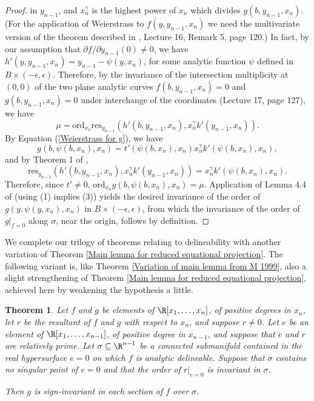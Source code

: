 \documentclass{article}
\newtheorem{theorem}{Theorem}
\begin{document}
\begin{proof}
    in $y_{n-1}$, and $x_n^\gamma$ is the highest power of $x_n$ which
    divides $g(b, y_{n-1}, x_n)$.
    (For the application of Weierstrass to $f(y, y_{n-1}, x_n)$
    we need the multivariate version of the theorem described in 
    \cite{Abhyankar1990}, Lecture 16, Remark 5, page 120.)
    In fact, by our assumption that 
    $\partial f/\partial y_{n-1}(0)\neq 0$,
    we have $h'(y, y_{n-1}, x_n) = y_{n-1} - \psi(y, x_n)$,
    for some analytic function $\psi$ defined in 
    $B \times (-\epsilon, \epsilon)$.
    Therefore, by the invariance of the intersection multiplicity
    at $(0,0)$ of the two plane analytic curves 
    $f(b, y_{n-1}, x_n) = 0$ and $g(b, y_{n-1}, x_n) = 0$
    under interchange of the coordinates 
    \cite{Abhyankar1990} (Lecture 17, page 127), we have
    \[\mu = \mathrm{ord}_{x_n} \mathrm{res}_{y_{n-1}}
            (h'(b, y_{n-1}, x_n), x_n^\gamma k'(y_{n-1}, x_n)).\]
    By Equation (\ref{Weierstrass for g}), we have
    \[g(b, \psi(b, x_n), x_n) = 
      t'(\psi(b, x_n), x_n) x_n^\gamma k'(\psi(b, x_n), x_n),\]
    and by Theorem 1 of \cite{Loos1982},
    \[ \mathrm{res}_{y_{n-1}} (h'(b, y_{n-1}, x_n), 
                               x_n^\gamma k'(y_{n-1}, x_n)) = 
                               x_n^\gamma k'(\psi(b, x_n), x_n).\]
    Therefore, since $t' \neq 0$, 
    $\mathrm{ord}_{x_n} g(b, \psi(b, x_n), x_n) = \mu$.
    Application of Lemma 4.4 of \cite{MPP2019}(using (1) implies (3))
    yields the desired invariance of the order of
    $g(y, \psi(y, x_n), x_n)$ in $B \times (-\epsilon, \epsilon)$,
    from which the invariance of the order of $g|_{f=0}$ along $\sigma$,
    near the origin, follows by definition.
\end{proof}

We complete our trilogy of theorems relating to delineability with another
variation of Theorem \ref{Main lemma for reduced equational projection}.
The following variant is, like 
Theorem \ref{Variation of main lemma from M 1999}, also a slight 
strengthening of Theorem \ref{Main lemma for reduced equational 
projection}, achieved here
by weakening the hypothesis a little.

\begin{theorem}
    Let $f$ and $g$ be elements of $\R[x_1, \ldots, x_n]$,
    of positive degrees in $x_n$, let $r$ be the resultant of $f$ and $g$ 
    with respect to $x_n$, and suppose $r \neq 0$.
    Let $e$ be an element of $\R[x_1, \ldots, x_{n-1}]$,
    of positive degree in $x_{n-1}$, and suppose that $e$ and $r$
    are relatively prime. Let $\sigma \subseteq \R^{n-1}$ be a connected
    submanifold contained in the real hypersurface $e = 0$
    on which $f$ is analytic delineable.
    Suppose that $\sigma$ contains no singular point of $e = 0$
    and that the order of $r|_{e=0}$ is invariant in $\sigma$.
    
    Then $g$ is sign-invariant in each section of $f$ over $\sigma$.
\end{theorem}
\end{document}
